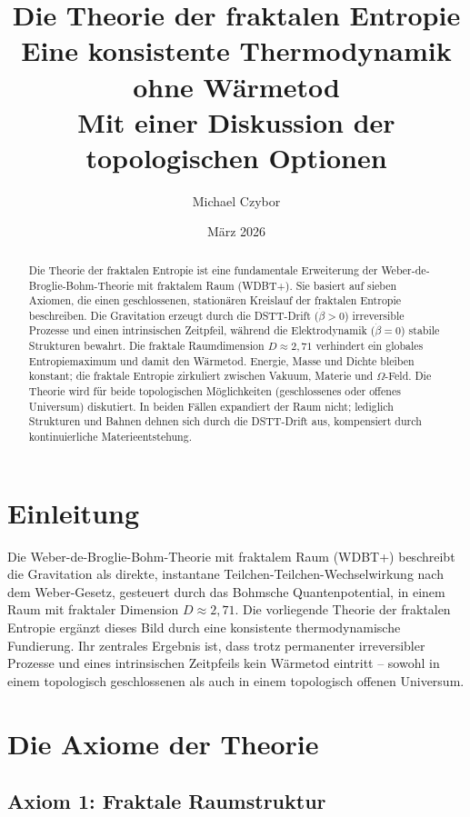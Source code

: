 \documentclass[12pt,a4paper]{article}
\title{Die Theorie der fraktalen Entropie\\
\Large Eine konsistente Thermodynamik ohne Wärmetod\\
\Large Mit einer Diskussion der topologischen Optionen}
\author{Michael Czybor}
\date{März 2026}
\begin{document}
\maketitle

\begin{abstract}
Die Theorie der fraktalen Entropie ist eine fundamentale Erweiterung der 
Weber-de-Broglie-Bohm-Theorie mit fraktalem Raum (WDBT+). Sie basiert auf 
sieben Axiomen, die einen geschlossenen, stationären Kreislauf der 
fraktalen Entropie beschreiben. Die Gravitation erzeugt durch die 
DSTT-Drift ($\dot{\beta}>0$) irreversible Prozesse und einen intrinsischen 
Zeitpfeil, während die Elektrodynamik ($\dot{\beta}=0$) stabile 
Strukturen bewahrt. Die fraktale Raumdimension $D\approx2,71$ verhindert 
ein globales Entropiemaximum und damit den Wärmetod. Energie, Masse und 
Dichte bleiben konstant; die fraktale Entropie zirkuliert zwischen 
Vakuum, Materie und $\Omega$-Feld. Die Theorie wird für beide 
topologischen Möglichkeiten (geschlossenes oder offenes Universum) 
diskutiert. In beiden Fällen expandiert der Raum nicht; lediglich 
Strukturen und Bahnen dehnen sich durch die DSTT-Drift aus, kompensiert 
durch kontinuierliche Materieentstehung.
\end{abstract}

\tableofcontents

\section{Einleitung}

Die Weber-de-Broglie-Bohm-Theorie mit fraktalem Raum (WDBT+) beschreibt 
die Gravitation als direkte, instantane Teilchen-Teilchen-Wechselwirkung 
nach dem Weber-Gesetz, gesteuert durch das Bohmsche Quantenpotential, in 
einem Raum mit fraktaler Dimension $D\approx2,71$. Die vorliegende 
Theorie der fraktalen Entropie ergänzt dieses Bild durch eine 
konsistente thermodynamische Fundierung. Ihr zentrales Ergebnis ist, 
dass trotz permanenter irreversibler Prozesse und eines intrinsischen 
Zeitpfeils kein Wärmetod eintritt – sowohl in einem topologisch 
geschlossenen als auch in einem topologisch offenen Universum.

\section{Die Axiome der Theorie}

\subsection{Axiom 1: Fraktale Raumstruktur}
\end{document}
